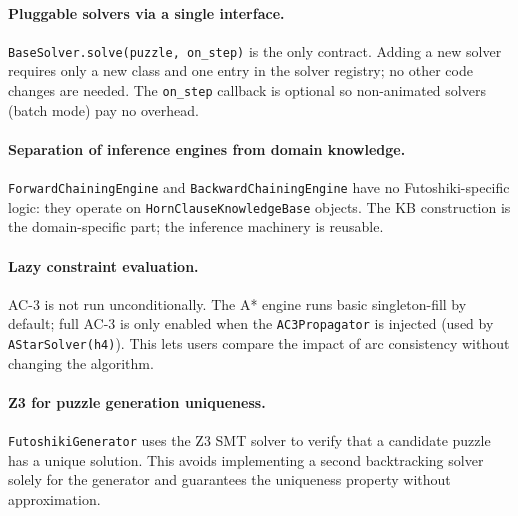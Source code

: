 \paragraph{Pluggable solvers via a single interface.}
\texttt{BaseSolver.solve(puzzle, on\_step)} is the only contract.
Adding a new solver requires only a new class and one entry in the
solver registry; no other code changes are needed.
The \texttt{on\_step} callback is optional so non-animated solvers (batch
mode) pay no overhead.

\paragraph{Separation of inference engines from domain knowledge.}
\texttt{ForwardChainingEngine} and \texttt{BackwardChainingEngine} have no
Futoshiki-specific logic: they operate on \texttt{HornClauseKnowledgeBase}
objects.
The KB construction is the domain-specific part; the inference machinery is
reusable.

\paragraph{Lazy constraint evaluation.}
AC-3 is not run unconditionally.
The A* engine runs basic singleton-fill by default; full AC-3 is only enabled
when the \texttt{AC3Propagator} is injected (used by \texttt{AStarSolver(h4)}).
This lets users compare the impact of arc consistency without changing the
algorithm.

\paragraph{Z3 for puzzle generation uniqueness.}
\texttt{FutoshikiGenerator} uses the Z3 SMT solver to verify that a candidate
puzzle has a unique solution.
This avoids implementing a second backtracking solver solely for the generator
and guarantees the uniqueness property without approximation.
